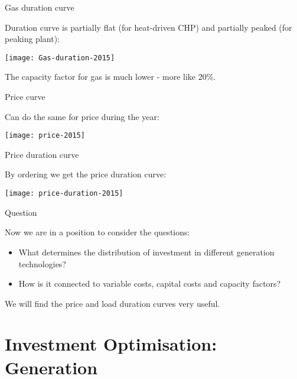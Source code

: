 \documentclass[10pt,aspectratio=169,dvipsnames]{beamer}
\let\olditem\item
\renewcommand{\item}{%
\olditem\vspace{5pt}}
\begin{document}
\begin{frame}{Gas duration curve}

  Duration curve is partially flat (for heat-driven CHP) and partially peaked (for \alert{peaking plant}):

  \centering
  \texttt{[image: Gas-duration-2015]}

  \raggedright
  The capacity factor for gas is much lower - more like 20\%.
\end{frame}

\begin{frame}{Price curve}

  Can do the same for price during the year:

  \centering
  \texttt{[image: price-2015]}

\end{frame}

\begin{frame}{Price duration curve}

  By ordering we get the \alert{price duration curve}:

  \centering
  \texttt{[image: price-duration-2015]}

\end{frame}



\begin{frame}{Question}



  Now we are in a position to consider the questions:

  \begin{itemize}
    \item What determines the distribution of investment in different generation technologies?
    \item How is it connected to variable costs, capital costs and capacity factors?
  \end{itemize}

  We will find the price and load duration curves very useful.
\end{frame}


\section{Investment Optimisation: Generation}
\end{document}
